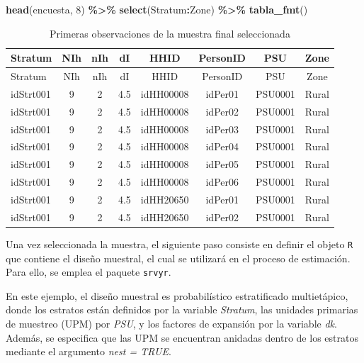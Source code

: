 \documentclass[
  spanish,
  12pt,
]{book}
\newenvironment{Shaded}{\begin{snugshade}}{\end{snugshade}}
\newcommand{\DecValTok}[1]{\textcolor[rgb]{0.00,0.00,0.81}{#1}}
\newcommand{\FunctionTok}[1]{\textcolor[rgb]{0.13,0.29,0.53}{\textbf{#1}}}
\newcommand{\NormalTok}[1]{#1}
\newcommand{\SpecialCharTok}[1]{\textcolor[rgb]{0.81,0.36,0.00}{\textbf{#1}}}
\begin{document}
\begin{Shaded}
\begin{Highlighting}[]
\FunctionTok{head}\NormalTok{(encuesta, }\DecValTok{8}\NormalTok{) }\SpecialCharTok{\%\textgreater{}\%}
  \FunctionTok{select}\NormalTok{(Stratum}\SpecialCharTok{:}\NormalTok{Zone) }\SpecialCharTok{\%\textgreater{}\%}
  \FunctionTok{tabla\_fmt}\NormalTok{()}
\end{Highlighting}
\end{Shaded}

\begin{longtable}[]{@{}lccccccc@{}}
\caption{\label{tab:tab-encuesta}Primeras observaciones de la muestra final seleccionada}\tabularnewline
\toprule\noalign{}
Stratum & NIh & nIh & dI & HHID & PersonID & PSU & Zone \\
\midrule\noalign{}
\endfirsthead
\toprule\noalign{}
Stratum & NIh & nIh & dI & HHID & PersonID & PSU & Zone \\
\midrule\noalign{}
\endhead
\bottomrule\noalign{}
\endlastfoot
idStrt001 & 9 & 2 & 4.5 & idHH00008 & idPer01 & PSU0001 & Rural \\
idStrt001 & 9 & 2 & 4.5 & idHH00008 & idPer02 & PSU0001 & Rural \\
idStrt001 & 9 & 2 & 4.5 & idHH00008 & idPer03 & PSU0001 & Rural \\
idStrt001 & 9 & 2 & 4.5 & idHH00008 & idPer04 & PSU0001 & Rural \\
idStrt001 & 9 & 2 & 4.5 & idHH00008 & idPer05 & PSU0001 & Rural \\
idStrt001 & 9 & 2 & 4.5 & idHH00008 & idPer06 & PSU0001 & Rural \\
idStrt001 & 9 & 2 & 4.5 & idHH20650 & idPer01 & PSU0001 & Rural \\
idStrt001 & 9 & 2 & 4.5 & idHH20650 & idPer02 & PSU0001 & Rural \\
\end{longtable}

Una vez seleccionada la muestra, el siguiente paso consiste en definir el objeto \texttt{R} que contiene el diseño muestral, el cual se utilizará en el proceso de estimación. Para ello, se emplea el paquete \texttt{srvyr}.

En este ejemplo, el diseño muestral es probabilístico estratificado multietápico, donde los estratos están definidos por la variable \emph{Stratum}, las unidades primarias de muestreo (UPM) por \emph{PSU}, y los factores de expansión por la variable \emph{dk}. Además, se especifica que las UPM se encuentran anidadas dentro de los estratos mediante el argumento \emph{nest = TRUE}.
\end{document}
